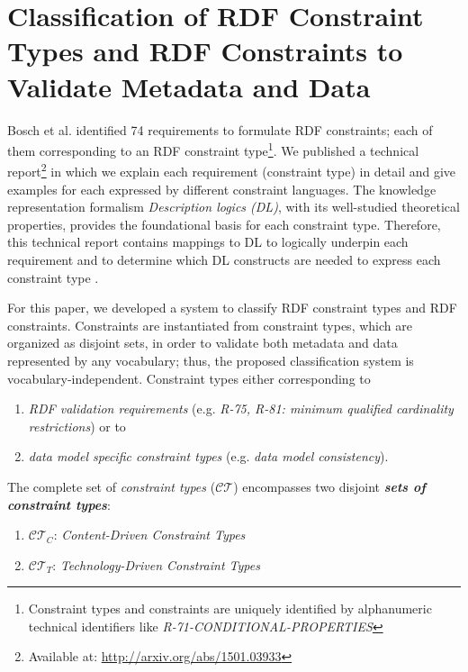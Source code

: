 \documentclass{llncs}
\begin{document}
\section{Classification of RDF Constraint Types and RDF Constraints to Validate Metadata and Data}
\label{classification}

Bosch et al. identified 74 requirements to formulate RDF constraints; each of them corresponding to an RDF constraint type\footnote{Constraint types and constraints are uniquely identified by alphanumeric technical identifiers like \emph{R-71-CONDITIONAL-PROPERTIES}}\cite{BoschNolleAcarEckert2015}. 
We published a technical report\footnote{Available at: \url{http://arxiv.org/abs/1501.03933}} in which we explain each requirement (constraint type) in detail and give examples for each expressed by different constraint languages.
The knowledge representation formalism \emph{Description logics (DL)}, with its  well-studied theoretical properties, provides the foundational basis for each constraint type.
Therefore, this technical report contains mappings to DL to logically underpin each requirement and to determine which DL constructs are needed to express each constraint type \cite{BoschNolleAcarEckert2015}.

For this paper, we developed a system to classify RDF constraint types and RDF constraints.
Constraints are instantiated from constraint types, which are organized as disjoint sets, in order to validate both metadata and data represented by any vocabulary; thus, the proposed classification system is vocabulary-independent.
Constraint types either corresponding to

\begin{enumerate}
	\item \emph{RDF validation requirements} (e.g. \emph{R-75, R-81: minimum qualified cardinality restrictions}) or to
	\item \emph{data model specific constraint types} (e.g. \emph{data model consistency})\cite{BoschZapilkoWackerowEckert2015}.
\end{enumerate}

The complete set of \emph{constraint types} ($\mathcal{CT}$) encompasses two disjoint \textbf{\emph{sets of constraint types}}:
\begin{enumerate}
	\item $\mathcal{CT}_{C}$: \emph{Content-Driven Constraint Types}
	\item $\mathcal{CT}_{T}$: \emph{Technology-Driven Constraint Types}
\end{enumerate}
\end{document}
